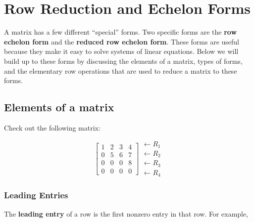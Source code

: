 \documentclass[
  letterpaper,
  DIV=11,
  numbers=noendperiod]{scrreprt}
\begin{document}

\hypertarget{row-reduction-and-echelon-forms}{%
\chapter*{Row Reduction and Echelon
Forms}\label{row-reduction-and-echelon-forms}}


A matrix has a few different ``special'' forms. Two specific forms are
the \textbf{row echelon form} and the \textbf{reduced row echelon form}.
These forms are useful because they make it easy to solve systems of
linear equations. Below we will build up to these forms by discussing
the elements of a matrix, types of forms, and the elementary row
operations that are used to reduce a matrix to these forms.

\hypertarget{elements-of-a-matrix}{%
\section*{Elements of a matrix}\label{elements-of-a-matrix}}


Check out the following matrix:

\[
\left[\begin{array}{ccc}
    1 & 2 & 3 & 4 \\
    0 & 5 & 6 & 7 \\
    0 & 0 & 0 & 8 \\
    0 & 0 & 0 & 0
\end{array}\right]
\begin{array}{c}
    \leftarrow R_1 \\
    \leftarrow R_2 \\
    \leftarrow R_3 \\
    \leftarrow R_4
\end{array}
\]

\hypertarget{leading-entries}{%
\subsection*{Leading Entries}\label{leading-entries}}

The \textbf{leading entry} of a row is the first nonzero entry in that
row. For example,
\end{document}
